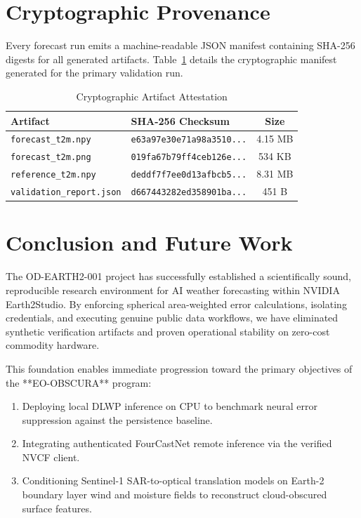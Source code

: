 \documentclass[10pt,journal,compsoc]{IEEEtran}
\begin{document}
\section{Cryptographic Provenance}
Every forecast run emits a machine-readable JSON manifest containing SHA-256 digests for all generated artifacts. Table~\ref{tab:provenance} details the cryptographic manifest generated for the primary validation run.

\begin{table}[htbp]
\caption{Cryptographic Artifact Attestation}
\label{tab:provenance}
\centering
\begin{tabular}{llc}
\toprule
Artifact & SHA-256 Checksum & Size \\
\midrule
\texttt{forecast\_t2m.npy} & \texttt{e63a97e30e71a98a3510...} & 4.15 MB \\
\texttt{forecast\_t2m.png} & \texttt{019fa67b79ff4ceb126e...} & 534 KB \\
\texttt{reference\_t2m.npy} & \texttt{deddf7f7ee0d13afbcb5...} & 8.31 MB \\
\texttt{validation\_report.json} & \texttt{d667443282ed358901ba...} & 451 B \\
\bottomrule
\end{tabular}
\end{table}

\section{Conclusion and Future Work}
The OD-EARTH2-001 project has successfully established a scientifically sound, reproducible research environment for AI weather forecasting within NVIDIA Earth2Studio. By enforcing spherical area-weighted error calculations, isolating credentials, and executing genuine public data workflows, we have eliminated synthetic verification artifacts and proven operational stability on zero-cost commodity hardware.

This foundation enables immediate progression toward the primary objectives of the **EO-OBSCURA** program:
\begin{enumerate}
    \item Deploying local DLWP inference on CPU to benchmark neural error suppression against the persistence baseline.
    \item Integrating authenticated FourCastNet remote inference via the verified NVCF client.
    \item Conditioning Sentinel-1 SAR-to-optical translation models on Earth-2 boundary layer wind and moisture fields to reconstruct cloud-obscured surface features.
\end{enumerate}
\end{document}
